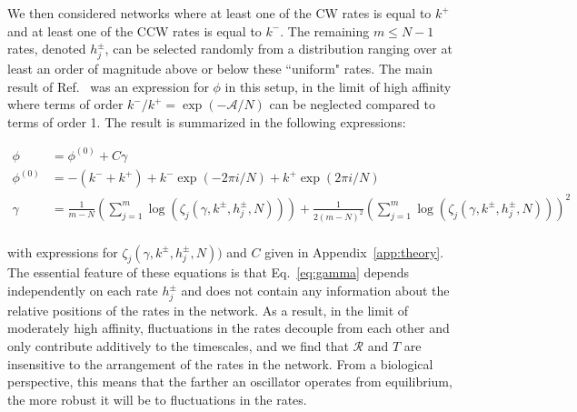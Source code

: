\documentclass[amsmath, preprintnumbers, 10pt, twocolumn, pre, bibliograpy]{revtex4-1}
\newcommand{\aff}{\mathcal A}
\newcommand{\R}{\mathcal R}
\providecommand{\DIFadd}[1]{{\protect\color{blue}\uwave{#1}}} %
\providecommand{\DIFaddbegin}{} %
\providecommand{\DIFaddend}{} %
\newcommand{\DIFaddincludegraphics}[2][]{{\color{blue}\fbox{\DIFOincludegraphics[#1]{#2}}}} %
\DeclareRobustCommand{\DIFaddbegin}{\DIFOaddbegin \let\includegraphics\DIFaddincludegraphics} %
\DeclareRobustCommand{\DIFaddend}{\DIFOaddend \let\includegraphics\DIFOincludegraphics} %
\begin{document}
We then considered networks where at least one of the CW \DIFaddbegin \DIFadd{(clockwise) }\DIFaddend rates is equal to $k^+$ and at least one of the CCW \DIFaddbegin \DIFadd{(counterclockwise) }\DIFaddend rates is equal to $k^-$. The remaining $m \leq N-1$ rates, denoted $h_j^\pm$, can be selected randomly from a distribution ranging over at least an order of magnitude above or below these ``uniform" rates. The main result of Ref.~ was an expression for $\phi$ in this setup, in the limit of high affinity where terms of order $k^-/k^+ = \exp(-\aff/N)$ can be neglected compared to terms of order 1. The result is summarized in the following expressions: %
\begin{widetext}
\begin{align}
\phi &= \phi^{(0)} + C \gamma \label{eq:phinew} \\
 \phi^{(0)} & = -(k^- + k^+) + k^-\exp(-2 \pi i/N) + k^+\exp(2 \pi i/N) \\
\gamma &= \frac{1}{m-N}\left(\sum_{j=1}^m \log(\zeta_j(\gamma, k^\pm, h_j^\pm, N))\right) + \frac{1}{2(m-N)^2}\left(\sum_{j=1}^m \log(\zeta_j(\gamma, k^\pm, h_j^\pm, N))\right)^2 \label{eq:gamma} \\
\end{align}
\end{widetext}
with expressions for $\zeta_j(\gamma, k^\pm, h_j^\pm, N))$ and $C$ given in Appendix~\ref{app:theory}. The essential feature of these equations is that Eq.~\ref{eq:gamma} depends independently on each rate $h_j^\pm$ and does not contain any information about the relative positions of the rates in the network. As a result, in the limit of moderately high affinity, fluctuations in the rates decouple from each other and only contribute additively to the timescales, and we find that $\R$ and $T$ are insensitive to the arrangement of the rates in the network.  From a biological perspective, this means that the farther an oscillator operates from equilibrium, the more robust it will be to fluctuations in the rates.
\end{document}
